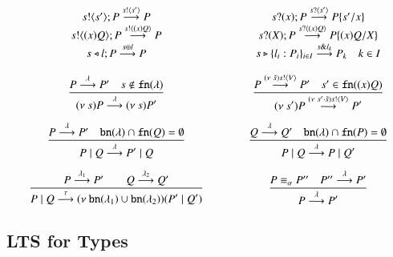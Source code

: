\[
\begin{array}{ccc}
	\bout{s}{s'} P \by{\bactout{s}{s'}} P
	&\qquad&
	\binp{s}{x} P \by{\bactinp{s}{s'}} P\subst{s'}{x}
	\\
	

	\bout{s}{\abs{x}{Q}} P \by{\bactout{s}{\abs{x}{Q}}} P
	&\qquad&
	\binp{s}{X} P \by{\bactinp{s}{\abs{x}Q}} P\subst{\abs{x}Q}{X}
	\\

	\bsel{s}{l}{P} \by{\bactsel{s}{l}} P
	&&
	\bbra{s}{l_i:P_i}_{i \in I} \by{\bactbra{s}{l_k}} P_k \quad k \in I
	\\[4mm]

	\tree{
		P \by{\lambda} P' \quad s \notin \fn{\lambda}
	}{
		\news{s} P \by{\lambda} \news{s} P' 
	}
	&&
	\tree{
		P \by{\news{\tilde{s}} \bactout{s}{V}} P' \quad s' \in \fn{\abs{x} Q}
	}{
		\news{s'} P \by{\news{s'\cat\tilde{s}} \bactout{s}{V}} P'
	}
	\\[7mm]

	\tree{
		P \by{\lambda} P' \quad \bn{\lambda} \cap \fn{Q} = \es
	}{
		P \Par Q \by{\lambda} P' \Par Q
	}
	&&
	\tree{
		Q \by{\lambda} Q' \quad \bn{\lambda} \cap \fn{P} = \es
	}{
		P \Par Q \by{\lambda} P \Par Q'
	}
	\\[7mm]

	\tree{
		P \by{\lambda_1} P' \qquad Q \by{\lambda_2} Q'
	}{
		P \Par Q \by{\tau} \newsp{\bn{\lambda_1} \cup \bn{\lambda_2}}{P' \Par Q'}
	}
	&&
	\tree{
		P \scong_\alpha P'' \quad P'' \by{\lambda} P'
	}{
		P \by{\lambda} P'
	}
\end{array}
\]

\subsection{LTS for Types}

